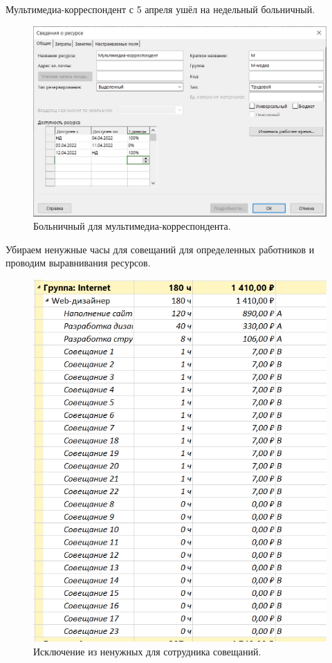 \documentclass[a4paper,14pt]{extreport} %
\begin{document}
\begin{enumerate}
Мультимедиа-корреспондент с 5 апреля ушёл на недельный больничный.
\begin{figure}[H]
	\centering
	\caption{Больничный для мультимедиа-корреспондента. }
	\includegraphics[scale=0.8]{chill}
\end{figure}

Убираем ненужные часы для совещаний для определенных работников и проводим выравнивания ресурсов. 

\begin{figure}[H]
	\centering
	\caption{Исключение из ненужных для сотрудника совещаний. }
	\includegraphics[scale=0.8]{meetings}
\end{figure}


\end{enumerate}
\end{document}

